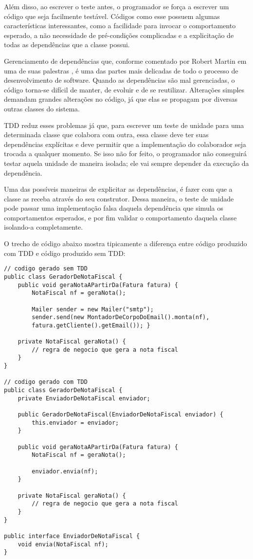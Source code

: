 Além disso, ao escrever o teste antes, o programador se força a escrever um
código que seja facilmente testável. Códigos como esse possuem algumas
características interessantes, como a facilidade para invocar o comportamento
esperado, a não necessidade de pré-condições complicadas e a explicitação de
todas as dependências que a classe possui.

Gerenciamento de dependências que, conforme comentado por Robert Martin em uma
de suas palestras \cite{bobmartin-infoq}, é uma das partes mais delicadas de
todo o processo de desenvolvimento de software. Quando as dependências são mal
gerenciadas, o código torna-se difícil de manter, de evoluir e de se reutilizar.
Alterações simples demandam grandes alterações no código, já que elas se
propagam por diversas outras classes do sistema.

TDD reduz esses problemas já que, para escrever um teste de unidade para uma
determinada classe que colabora com outra, essa classe deve ter suas
dependências explícitas e deve permitir que a implementação do colaborador seja
trocada a qualquer momento. Se isso não for feito, o programador não conseguirá
testar aquela unidade de maneira isolada; ele vai sempre depender da execução da
dependência.

Uma das possíveis maneiras de explicitar as dependências, é fazer com que a
classe as receba através do seu construtor. Dessa maneira, o teste de unidade
pode passar uma implementação falsa daquela dependência que simula os
comportamentos esperados, e por fim validar o comportamento daquela classe
isolando-a completamente.

O trecho de código abaixo mostra tipicamente a diferença entre código produzido
com TDD e código produzido sem TDD:

\begin{lstlisting}[frame=trbl]
// codigo gerado sem TDD
public class GeradorDeNotaFiscal {
	public void geraNotaAPartirDa(Fatura fatura) {
		NotaFiscal nf = geraNota(); 
		
		Mailer sender = new Mailer("smtp");
		sender.send(new MontadorDeCorpoDoEmail().monta(nf),
		fatura.getCliente().getEmail()); }
	
	private NotaFiscal geraNota() {
		// regra de negocio que gera a nota fiscal
	}
}

// codigo gerado com TDD
public class GeradorDeNotaFiscal {
	private EnviadorDeNotaFiscal enviador;
	
	public GeradorDeNotaFiscal(EnviadorDeNotaFiscal enviador) {
		this.enviador = enviador;
	}
	
	public void geraNotaAPartirDa(Fatura fatura) {
		NotaFiscal nf = geraNota(); 
		
		enviador.envia(nf);
	}
	
	private NotaFiscal geraNota() {
		// regra de negocio que gera a nota fiscal
	}
}

public interface EnviadorDeNotaFiscal {
	void envia(NotaFiscal nf);
}
\end{lstlisting}

